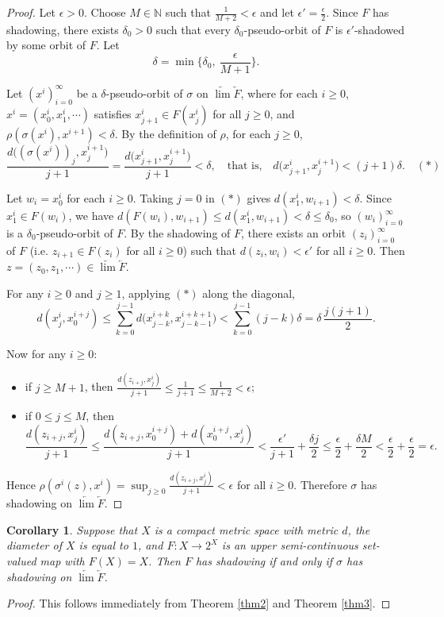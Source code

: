 \documentclass[12pt]{amsart}
\newtheorem{corollary}[theorem]{Corollary}
\theoremstyle{definition}
\begin{document}
\begin{proof}
	Let $\epsilon>0$. Choose $M\in\mathbb{N}$ such that $\frac{1}{M+2}<\epsilon$ and let $\epsilon'=\frac{\epsilon}{2}$. Since $F$ has shadowing, there exists $\delta_0>0$ such that every $\delta_0$-pseudo-orbit of $F$ is $\epsilon'$-shadowed by some orbit of $F$. Let
	$$\delta=\min\Big\{\delta_0,\ \frac{\epsilon}{M+1}\Big\}.$$
	
	Let $(x^i)_{i=0}^\infty$ be a $\delta$-pseudo-orbit of $\sigma$ on $\underleftarrow{\lim} \underleftarrow{F}$, where for each $i\geq0$, $x^i=(x^i_0,x^i_1,\cdots)$ satisfies $x^i_{j+1}\in F(x^i_j)$ for all $j\geq0$, and $\rho(\sigma(x^i),x^{i+1})<\delta$. By the definition of $\rho$, for each $j\geq0$,
	$$\frac{d\big((\sigma(x^i))_j,x^{i+1}_j\big)}{j+1}=\frac{d\big(x^i_{j+1},x^{i+1}_j\big)}{j+1}<\delta,\quad\text{that is,}\quad d\big(x^i_{j+1},x^{i+1}_j\big)<(j+1)\delta.\quad(\ast)$$
	
	Let $w_i=x^i_0$ for each $i\geq0$. Taking $j=0$ in $(\ast)$ gives $d(x^i_1,w_{i+1})<\delta$. Since $x^i_1\in F(w_i)$, we have $d(F(w_i),w_{i+1})\leq d(x^i_1,w_{i+1})<\delta\leq\delta_0$, so $(w_i)_{i=0}^\infty$ is a $\delta_0$-pseudo-orbit of $F$. By the shadowing of $F$, there exists an orbit $(z_i)_{i=0}^\infty$ of $F$ (i.e. $z_{i+1}\in F(z_i)$ for all $i\geq0$) such that $d(z_i,w_i)<\epsilon'$ for all $i\geq0$. Then $z=(z_0,z_1,\cdots)\in \underleftarrow{\lim} \underleftarrow{F}$.
	
	For any $i\geq0$ and $j\geq1$, applying $(\ast)$ along the diagonal,
	$$d(x^i_j,x^{i+j}_0)\leq\sum_{k=0}^{j-1}d\big(x^{i+k}_{j-k},x^{i+k+1}_{j-k-1}\big)<\sum_{k=0}^{j-1}(j-k)\delta=\delta\,\frac{j(j+1)}{2}.$$
	
	Now for any $i\geq0$:
	\begin{itemize}
		\item[(1)]if $j\geq M+1$, then $\frac{d(z_{i+j},x^i_j)}{j+1}\leq\frac{1}{j+1}\leq\frac{1}{M+2}<\epsilon$;
		\item[(2)]if $0\leq j\leq M$, then
		$$\frac{d(z_{i+j},x^i_j)}{j+1}\leq\frac{d(z_{i+j},x^{i+j}_0)+d(x^{i+j}_0,x^i_j)}{j+1}<\frac{\epsilon'}{j+1}+\frac{\delta j}{2}\leq\frac{\epsilon}{2}+\frac{\delta M}{2}<\frac{\epsilon}{2}+\frac{\epsilon}{2}=\epsilon.$$
	\end{itemize}
	Hence $\rho(\sigma^i(z),x^i)=\sup_{j\geq0}\frac{d(z_{i+j},x^i_j)}{j+1}<\epsilon$ for all $i\geq0$. Therefore $\sigma$ has shadowing on $\underleftarrow{\lim} \underleftarrow{F}$.
\end{proof}

\begin{corollary}\label{cor1}
	Suppose that $X$ is a compact metric space with metric $d$, the diameter of $X$ is equal to $1$, and $F:X\rightarrow 2^X$ is an upper semi-continuous set-valued map with $F(X)=X$. Then $F$ has shadowing if and only if $\sigma$ has shadowing on $\underleftarrow{\lim} \underleftarrow{F}$.
\end{corollary}
\begin{proof}
	This follows immediately from Theorem \ref{thm2} and Theorem \ref{thm3}.
\end{proof}
\end{document}
